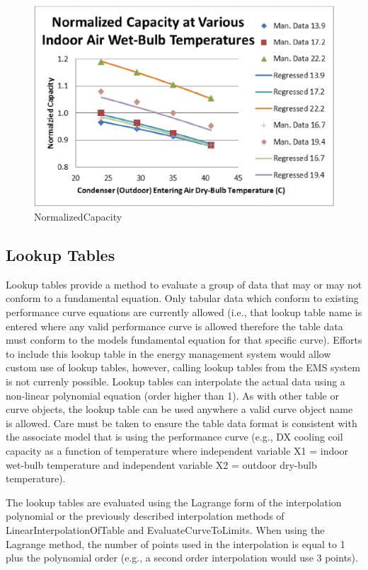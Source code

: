 \begin{figure}[htbp]
\centering
\includegraphics{media/image7873.png}
\caption{NormalizedCapacity}
\end{figure}

\subsection{Lookup Tables}\label{lookup-tables}

Lookup tables provide a method to evaluate a group of data that may or may not conform to a fundamental equation. Only tabular data which conform to existing performance curve equations are currently allowed (i.e., that lookup table name is entered where any valid performance curve is allowed therefore the table data must conform to the models fundamental equation for that specific curve). Efforts to include this lookup table in the energy management system would allow custom use of lookup tables, however, calling lookup tables from the EMS system is not currenly possible. Lookup tables can interpolate the actual data using a non-linear polynomial equation (order higher than 1). As with other table or curve objects, the lookup table can be used anywhere a valid curve object name is allowed. Care must be taken to ensure the table data format is consistent with the associate model that is using the performance curve (e.g., DX cooling coil capacity as a function of temperature where independent variable X1 = indoor wet-bulb temperature and independent variable X2 = outdoor dry-bulb temperature).

The lookup tables are evaluated using the Lagrange form of the interpolation polynomial or the previously described interpolation methods of LinearInterpolationOfTable and EvaluateCurveToLimits. When using the Lagrange method, the number of points used in the interpolation is equal to 1 plus the polynomial order (e.g., a second order interpolation would use 3 points).


